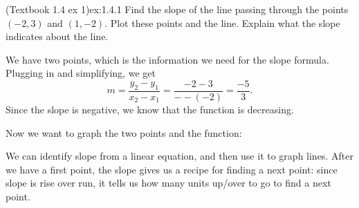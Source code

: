 \documentclass{article}
\begin{document}
\begin{example}{(Textbook 1.4 ex 1)}{ex:1.4.1}
    Find the slope of the line passing through the points $(-2,3)$ and $(1,-2)$. Plot these points and the line. Explain what the slope indicates about the line.
\end{example}
\begin{solution}
    We have two points, which is the information we need for the slope formula. Plugging in and simplifying, we get \[m=\frac{y_2-y_1}{x_2-x_1}=\frac{-2-3}{--(-2)}=\frac{-5}{3}.\]
    Since the slope is negative, we know that the function is decreasing.

    Now we want to graph the two points and the function:
    \begin{center}\end{center}
\end{solution}

We can identify slope from a linear equation, and then use it to graph lines. After we have a first point, the slope gives us a recipe for finding a next point: since slope is rise over run, it tells us how many units up/over to go to find a next point.
\end{document}
